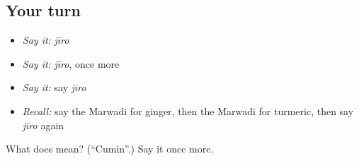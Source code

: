 \subsection*{Your turn}
\begin{itemize}
\raggedright
  \item \emph{Say it:} \emph{jīro}
  \item \emph{Say it:} \emph{jīro}, once more
  \item \emph{Say it:} say \emph{jīro}
  \item \emph{Recall:} say the Marwadi for ginger, then the Marwadi for turmeric, then say \emph{jīro} again
\end{itemize}

\begin{tcolorbox}[breakable,colback=teal!4,colframe=teal!35!black,title={Before you move on}]
What does  mean? (\textquotedblleft{}Cumin\textquotedblright{}.) Say it once more.
\end{tcolorbox}
